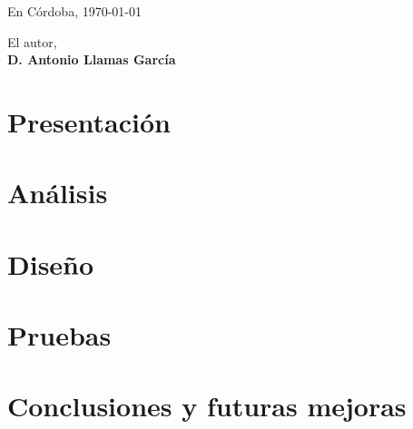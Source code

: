 \documentclass[a4paper,12pt,twoside,final]{book}
\begin{document}
\vspace{2cm}

\begin{flushright}
En Córdoba, \monthyeardate\today
\end{flushright}

\vspace{2cm}

\begin{flushleft}
El autor,\\[2cm]
\textbf{D. Antonio Llamas García}
\end{flushleft}

\clearpage

\thispagestyle{empty}
\pagecolor{white}


\cleardoublepage
\setcounter{page}{1}
\setcounter{tocdepth}{3} %
\setcounter{secnumdepth}{3} %
\tableofcontents
\listoffigures
\listoftables

\afterpage{\null\newpage}
\thispagestyle{empty}
\newpage
\mainmatter
\part{Presentación}






\part{Análisis}



\part{Diseño}




\part{Pruebas}


\part{Conclusiones y futuras mejoras}


\end{document}
